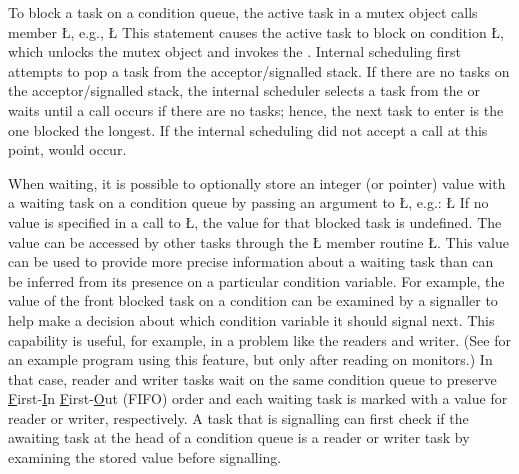 \documentclass[openright,twoside]{report}
\begin{document}
To block a task on a condition queue, the active task in a mutex object calls member \LGinlinetrue\LGbegin\lgrinde\L{}\endlgrinde\LGend{}, e.g.,
\LGinlinefalse\LGbegin\lgrinde
\L{}
\endlgrinde\LGend
This statement causes the active task to block on condition \LGinlinetrue\LGbegin\lgrinde\L{}\endlgrinde\LGend{}, which unlocks the mutex object and invokes the .
Internal scheduling first attempts to pop a task from the acceptor/signalled stack.
If there are no tasks on the acceptor/signalled stack, the internal scheduler selects a task from the  or waits until a call occurs if there are no tasks;
hence, the next task to enter is the one blocked the longest.
If the internal scheduling did not accept a call at this point,  would occur.

When waiting, it is possible to optionally store an integer (or pointer) value with a waiting task on a condition queue by passing an argument to \LGinlinetrue\LGbegin\lgrinde\L{}\endlgrinde\LGend{}, e.g.:
\LGinlinefalse\LGbegin\lgrinde
\L{}
\endlgrinde\LGend
If no value is specified in a call to \LGinlinetrue\LGbegin\lgrinde\L{}\endlgrinde\LGend{}, the value for that blocked task is undefined.
The value can be accessed by other tasks through the \LGinlinetrue\LGbegin\lgrinde\L{}\endlgrinde\LGend{} member routine \LGinlinetrue\LGbegin\lgrinde\L{}\endlgrinde\LGend{}.
This value can be used to provide more precise information about a waiting task than can be inferred from its presence on a particular condition variable.
For example, the value of the front blocked task on a condition can be examined by a signaller to help make a decision about which condition variable it should signal next.
This capability is useful, for example, in a problem like the readers and writer.
(See  for an example program using this feature, but only after reading  on monitors.)
In that case, reader and writer tasks wait on the same condition queue to preserve \underline{F}irst-\underline{I}n \underline{F}irst-\underline{O}ut (FIFO) order and each waiting task is marked with a value for reader or writer, respectively.
A task that is signalling can first check if the awaiting task at the head of a condition queue is a reader or writer task by examining the stored value before signalling.
\end{document}
